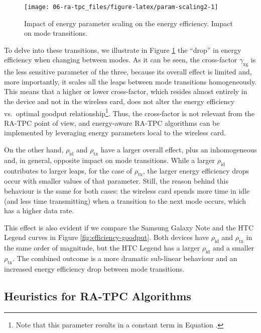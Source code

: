 \documentclass[twoside,nohyper]{tufte-book}
\makeatletter
\let\orig@maketag@@@\maketag@@@
\renewcommand{\eqref}[1]{\textup{\let\maketag@@@\orig@maketag@@@\tagform@{\ref{#1}}}}
\def\maketag@@@#1{\hbox{\rlap{\kern\marginparsep\m@th\normalfont#1}\kern1sp}}
\theoremstyle{definition}
\theoremstyle{definition}
\theoremstyle{definition}
\theoremstyle{remark}
\makeatother
\begin{document}
\begin{figure}

{\centering \texttt{[image: 06-ra-tpc\_files/figure-latex/param-scaling2-1]} 

}

\caption[Impact of energy parameter scaling on the energy
efficiency. Impact on mode transitions.]{Impact of energy parameter scaling on the energy
efficiency. Impact on mode transitions.}\label{fig:param-scaling2}
\end{figure}

To delve into these transitions, we illustrate in Figure
\ref{fig:param-scaling2} the ``drop'' in energy efficiency when changing
between modes. As it can be seen, the cross-factor
\(\gamma_\mathrm{xg}\) is the less sensitive parameter of the three,
because its overall effect is limited and, more importantly, it scales
all the leaps between mode transitions homogeneously. This means that a
higher or lower cross-factor, which resides almost entirely in the
device and not in the wireless card, does not alter the energy
efficiency vs.~optimal goodput relationship\footnote{Note that this
  parameter results in a constant term in Equation
  \eqref{eq:energyperframe}.}. Thus, the cross-factor is not relevant from
the RA-TPC point of view, and energy-aware RA-TPC algorithms can be
implemented by leveraging energy parameters local to the wireless card.

On the other hand, \(\rho_\mathrm{id}\) and \(\rho_\mathrm{tx}\) have a
larger overall effect, plus an inhomogeneous and, in general, opposite
impact on mode transitions. While a larger \(\rho_\mathrm{id}\)
contributes to larger leaps, for the case of \(\rho_\mathrm{tx}\), the
larger energy efficiency drops occur with smaller values of that
parameter. Still, the reason behind this behaviour is the same for both
cases: the wireless card spends more time in idle (and less time
transmitting) when a transition to the next mode occurs, which has a
higher data rate.

This effect is also evident if we compare the Samsung Galaxy Note and
the HTC Legend curves in Figure \ref{fig:efficiency-goodput}. Both
devices have \(\rho_\mathrm{id}\) and \(\rho_\mathrm{tx}\) in the same
order of magnitude, but the HTC Legend has a larger \(\rho_\mathrm{id}\)
and a smaller \(\rho_\mathrm{tx}\). The combined outcome is a more
dramatic sub-linear behaviour and an increased energy efficiency drop
between mode transitions.

\hypertarget{heuristics-for-ra-tpc-algorithms}{%
\subsection{Heuristics for RA-TPC
Algorithms}\label{heuristics-for-ra-tpc-algorithms}}
\end{document}
